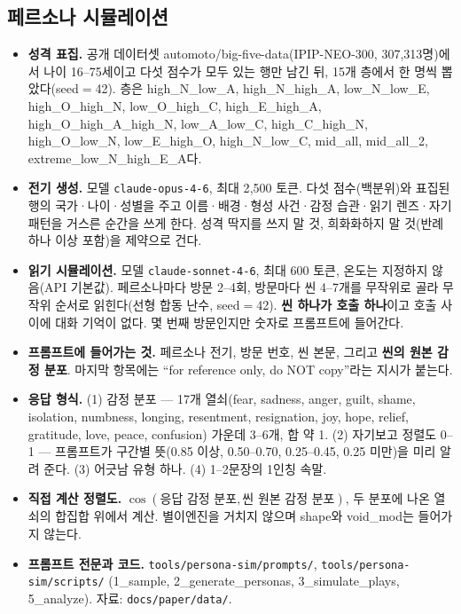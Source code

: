 \documentclass[11pt, a4paper]{article}
\begin{document}
\subsection{페르소나 시뮬레이션}
\label{app:sim}

\begin{itemize}
  \item \textbf{성격 표집.} 공개 데이터셋 automoto/big-five-data(IPIP-NEO-300, 307{,}313명)에서 나이 16--75세이고 다섯 점수가 모두 있는 행만 남긴 뒤, 15개 층에서 한 명씩 뽑았다(seed$=$42). \sloppy 층은 high\_N\_low\_A, high\_N\_high\_A, low\_N\_low\_E, high\_O\_high\_N, low\_O\_high\_C, high\_E\_high\_A, high\_O\_high\_A\_high\_N, low\_A\_low\_C, high\_C\_high\_N, high\_O\_low\_N, low\_E\_high\_O, high\_N\_low\_C, mid\_all, mid\_all\_2, extreme\_low\_N\_high\_E\_A다.
  \item \textbf{전기 생성.} 모델 \texttt{claude-opus-4-6}, 최대 2{,}500 토큰. 다섯 점수(백분위)와 표집된 행의 국가·나이·성별을 주고 이름·배경·형성 사건·감정 습관·읽기 렌즈·자기 패턴을 거스른 순간을 쓰게 한다. 성격 딱지를 쓰지 말 것, 희화화하지 말 것(반례 하나 이상 포함)을 제약으로 건다.
  \item \textbf{읽기 시뮬레이션.} 모델 \texttt{claude-sonnet-4-6}, 최대 600 토큰, 온도는 지정하지 않음(API 기본값). 페르소나마다 방문 2--4회, 방문마다 씬 4--7개를 무작위로 골라 무작위 순서로 읽힌다(선형 합동 난수, seed$=$42). \textbf{씬 하나가 호출 하나}이고 호출 사이에 대화 기억이 없다. 몇 번째 방문인지만 숫자로 프롬프트에 들어간다.
  \item \textbf{프롬프트에 들어가는 것.} 페르소나 전기, 방문 번호, 씬 본문, 그리고 \textbf{씬의 원본 감정 분포}. 마지막 항목에는 ``for reference only, do NOT copy''라는 지시가 붙는다.
  \item \textbf{응답 형식.} (1) 감정 분포 --- 17개 열쇠(fear, sadness, anger, guilt, shame, isolation, numbness, longing, resentment, resignation, joy, hope, relief, gratitude, love, peace, confusion) 가운데 3--6개, 합 약 1. (2) 자기보고 정렬도 0--1 --- 프롬프트가 구간별 뜻(0.85 이상, 0.50--0.70, 0.25--0.45, 0.25 미만)을 미리 알려 준다. (3) 어긋남 유형 하나. (4) 1--2문장의 1인칭 속말.
  \item \textbf{직접 계산 정렬도.} $\cos(\text{응답 감정 분포}, \text{씬 원본 감정 분포})$, 두 분포에 나온 열쇠의 합집합 위에서 계산. 별이엔진을 거치지 않으며 shape와 void\_mod는 들어가지 않는다.
  \item \textbf{프롬프트 전문과 코드.} \texttt{tools/persona-sim/prompts/}, \texttt{tools/persona-sim/scripts/} (1\_sample, 2\_generate\_personas, 3\_simulate\_plays, 5\_analyze). 자료: \texttt{docs/paper/data/}.
\end{itemize}
\end{document}
